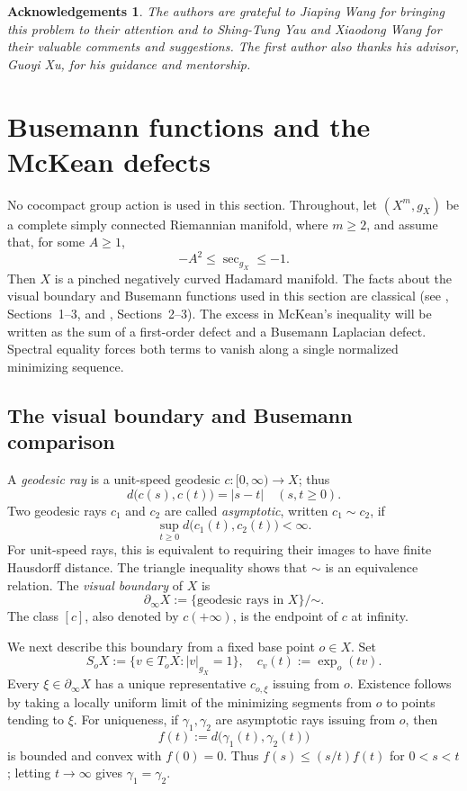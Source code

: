 \documentclass[12pt]{amsart}
\newtheorem*{acknowledgements}{Acknowledgements}
\theoremstyle{definition}
\numberwithin{equation}{section}
\begin{document}
\begin{acknowledgements}
The authors are grateful to Jiaping Wang for bringing this problem to their attention and to Shing-Tung Yau and Xiaodong Wang for their valuable comments and suggestions. The first author also thanks his advisor, Guoyi Xu, for his guidance and mentorship.
\end{acknowledgements}

\section{Busemann functions and the McKean defects}
\label{sec:busemann-defects}

No cocompact group action is used in this section.  Throughout, let
\((X^m,g_X)\) be a complete simply connected Riemannian manifold, where
\(m\geq2\), and assume that, for some \(A\geq1\),
\begin{equation}\label{eq:pinched-curvature}
  -A^2\leq\sec_{g_X}\leq-1.
\end{equation}
Then \(X\) is a pinched negatively curved Hadamard manifold.  The
facts about the visual boundary and Busemann functions used in this
section are classical
(see \cite{EberleinONeill1973}, Sections~1--3, and
\cite{HeintzeImHof1977}, Sections~2--3).  The excess in McKean's
inequality will be written as the sum of a first-order defect and a
Busemann Laplacian defect.  Spectral equality forces both terms to vanish
along a single normalized minimizing sequence.

\subsection{The visual boundary and Busemann comparison}

A \emph{geodesic ray} is a unit-speed geodesic
\(c\colon[0,\infty)\to X\); thus
\[
  d\bigl(c(s),c(t)\bigr)=|s-t|
  \quad (s,t\geq0).
\]
Two geodesic rays \(c_1\) and \(c_2\) are called \emph{asymptotic}, written
\(c_1\sim c_2\), if
\[
  \sup_{t\geq0}d\bigl(c_1(t),c_2(t)\bigr)<\infty.
\]
For unit-speed rays, this is equivalent to requiring their images to have
finite Hausdorff distance.  The triangle inequality shows that \(\sim\) is
an equivalence relation.  The \emph{visual boundary} of \(X\) is
\[
  \partial_\infty X
  :=
  \{\text{geodesic rays in \(X\)}\}/\mathord{\sim}.
\]
The class \([c]\), also denoted by \(c(+\infty)\), is the endpoint of \(c\)
at infinity.

We next describe this boundary from a fixed base point \(o\in X\).  Set
\[
  S_oX:=\{v\in T_oX:|v|_{g_X}=1\},
  \quad
  c_v(t):=\exp_o(tv).
\]
Every \(\xi\in\partial_\infty X\) has a unique representative
\(c_{o,\xi}\) issuing from \(o\).  Existence follows by taking a locally
uniform limit of the minimizing segments from \(o\) to points tending to
\(\xi\).  For uniqueness, if \(\gamma_1,\gamma_2\) are asymptotic rays
issuing from \(o\), then
\[
  f(t):=d\bigl(\gamma_1(t),\gamma_2(t)\bigr)
\]
is bounded and convex with \(f(0)=0\).  Thus
\(f(s)\leq (s/t)f(t)\) for \(0<s<t\); letting \(t\to\infty\) gives
\(\gamma_1=\gamma_2\).
\end{document}
